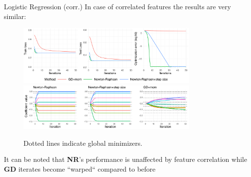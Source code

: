 \documentclass[11pt,compress,t,notes=noshow, xcolor=table]{beamer}
\begin{document}
\begin{vbframe}{Logistic Regression (corr.)}
\vspace{-0.4cm}
In case of correlated features the results are very similar:
\begin{figure}
            \includegraphics[width=0.8\textwidth]{figure_man/simu-newton/NR_GD_log_indep_50iters_corr.pdf} \\
             \includegraphics[width=0.8\textwidth]{figure_man/simu-newton/NR_GD_log_coef_50indep_corr.pdf}\\
            \begin{footnotesize}
            Dotted lines indicate global minimizers.
            \end{footnotesize}
\end{figure}
It can be noted that \textbf{NR}'s performance is unaffected by feature correlation while \textbf{GD} iterates become ``warped`` compared to before
\end{vbframe}
\end{document}

